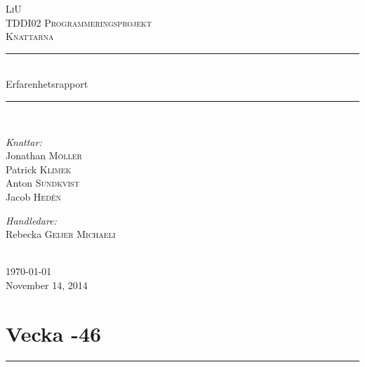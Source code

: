 \documentclass{article}
\newcommand{\HRule}{\rule{\linewidth}{0.5mm}}
\begin{document}
\begin{titlepage}
\center

\textsc{\LARGE LiU}\\[1.5cm]
\textsc{\Large TDDI02 Programmeringsprojekt}\\[0.5cm]
\textsc{\large Knattarna}\\[0.5cm]

\HRule\\[0.4cm]
{\huge Erfarenhetsrapport}\\[0.4cm]
\HRule\\[1.4cm]

\begin{minipage}{0.4\textwidth}
\begin{flushleft} \large
\emph{Knattar:}\\
Jonathan \textsc{Möller}\\
Patrick \textsc{Klimek}\\
Anton \textsc{Sundkvist}\\
Jacob \textsc{Hedén}\\
\end{flushleft}
\end{minipage}
\begin{minipage}{0.4\textwidth}
\begin{flushright} \large
\emph{Handledare:} \\
Rebecka \textsc{Geijer Michaeli} %
\end{flushright}
\end{minipage}\\[4cm]


{\large \today}\\[0.3cm] %
{\large November 14, 2014}\\[3cm] %


\end{titlepage}



\newpage

\section*{ {\center Vecka -46} }
\HRule \\[2 cm]
\end{document}
